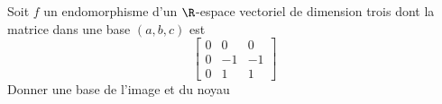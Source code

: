 Soit $f$ un endomorphisme d'un $\R$-espace vectoriel de dimension trois dont la matrice dans une base $(a,b,c)$ est
  \[
  \left[
  \begin{array}{ccc}
	  0 & 0 & 0 \\
	  0 & -1 & -1 \\
	  0 & 1 & 1
  \end{array}
  \right]
  \]
  Donner une base de l'image et du noyau \bigskip \bigskip